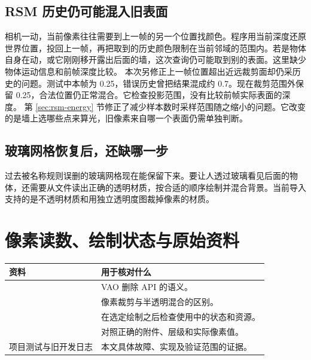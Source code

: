 \subsection{RSM 历史仍可能混入旧表面}
相机一动，当前像素往往需要到上一帧的另一个位置找颜色。程序用当前深度还原世界位置，投回上一帧，再把取到的历史颜色限制在当前邻域的范围内。若是物体自身在动，或它刚刚移开露出后面的墙，这次查询仍可能取到别的表面。这里缺少物体运动信息和前帧深度比较。
本次另修正上一帧位置超出近远裁剪面却仍采历史的问题。测试中本帧为 0.25，错误历史曾把结果混成约 0.7。现在裁剪范围外保留 0.25，合法位置仍正常混合。它检查投影范围，没有比较前帧实际表面的深度。
第 \ref{sec:rsm-energy} 节修正了减少样本数时采样范围随之缩小的问题。它改变的是墙上选哪些点来算光，旧像素来自哪一个表面仍需单独判断。

\subsection{玻璃网格恢复后，还缺哪一步}
过去被名称规则误删的玻璃网格现在能保留下来。要让人透过玻璃看见后面的物体，还需要从文件读出正确的透明材质，按合适的顺序绘制并混合背景。当前导入支持的是不透明材质和用独立透明度图裁掉像素的材质。

\section{像素读数、绘制状态与原始资料}
\noindent\begin{tabularx}{\textwidth}{L{4.3cm}Y}
\toprule
资料 & 用于核对什么 \\
\midrule
{} & VAO 删除 API 的语义。 \\
 & 像素裁剪与半透明混合的区别。 \\
 & 在选定绘制之后检查使用中的状态和资源。 \\
 & 对照正确的附件、层级和实际像素值。 \\
项目测试与旧开发日志 & 本文具体故障、实现及验证范围的证据。 \\
\bottomrule
\end{tabularx}

